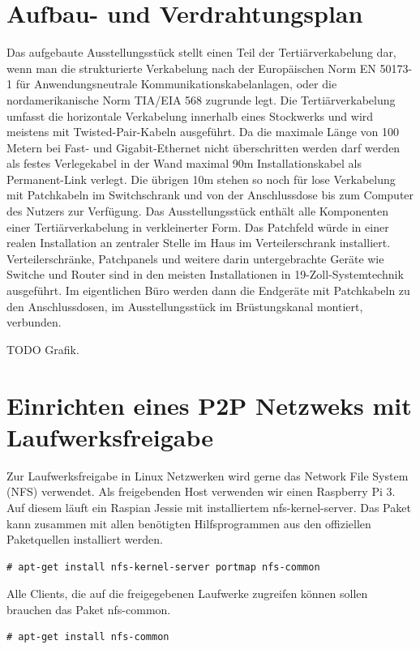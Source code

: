 \documentclass[
a4paper,     %
 headsepline, %
11pt         %
]{scrartcl}  %
\begin{document}
\section{Aufbau- und Verdrahtungsplan}
Das aufgebaute Ausstellungsstück stellt einen Teil der Tertiärverkabelung dar, wenn man die strukturierte Verkabelung nach der Europäischen Norm EN 50173-1 für Anwendungsneutrale Kommunikationskabelanlagen, oder die nordamerikanische Norm TIA/EIA 568 zugrunde legt.
Die Tertiärverkabelung umfasst die horizontale Verkabelung innerhalb eines Stockwerks und wird meistens mit Twisted-Pair-Kabeln ausgeführt.
Da die maximale Länge von 100 Metern bei Fast- und Gigabit-Ethernet nicht überschritten werden darf werden als festes Verlegekabel in der Wand maximal 90m Installationskabel als Permanent-Link verlegt. 
Die übrigen 10m stehen so noch für lose Verkabelung mit Patchkabeln im Switchschrank und von der Anschlussdose bis zum Computer des Nutzers zur Verfügung.
Das Ausstellungsstück enthält alle Komponenten einer Tertiärverkabelung in verkleinerter Form.
Das Patchfeld würde in einer realen Installation an zentraler Stelle im Haus im Verteilerschrank installiert. 
Verteilerschränke, Patchpanels und weitere darin untergebrachte Geräte wie Switche und Router sind in den meisten Installationen in 19-Zoll-Systemtechnik ausgeführt.
Im eigentlichen Büro werden dann die Endgeräte mit Patchkabeln zu den Anschlussdosen, im Ausstellungsstück im Brüstungskanal montiert, verbunden. 

TODO Grafik.

\section{Einrichten eines P2P Netzweks mit Laufwerksfreigabe}
Zur Laufwerksfreigabe in Linux Netzwerken wird gerne das Network File System (NFS) verwendet. 
Als freigebenden Host verwenden wir einen Raspberry Pi 3. 
Auf diesem läuft ein Raspian Jessie mit installiertem nfs-kernel-server. 
Das Paket kann zusammen mit allen benötigten Hilfsprogrammen aus den offiziellen Paketquellen installiert werden.
\begin{lstlisting}[frame=single]
	# apt-get install nfs-kernel-server portmap nfs-common
\end{lstlisting}

Alle Clients, die auf die freigegebenen Laufwerke zugreifen können sollen brauchen das Paket nfs-common.
\begin{lstlisting}[frame=single]
	# apt-get install nfs-common
\end{lstlisting}
\end{document}
